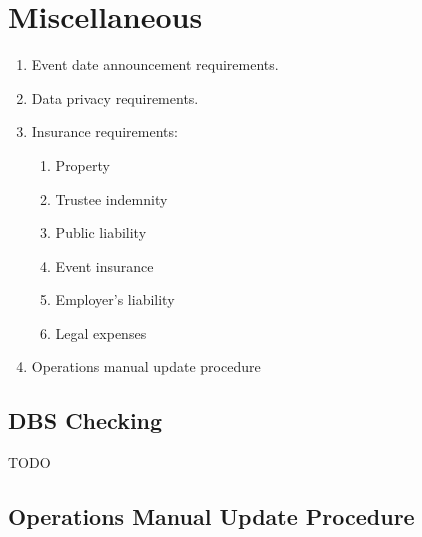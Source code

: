 \chapter{Miscellaneous}
\begin{enumerate}
\item Event date announcement requirements.
\item Data privacy requirements.
\item Insurance requirements:
  \begin{enumerate}
  \item Property
  \item Trustee indemnity
  \item Public liability
  \item Event insurance
  \item Employer's liability
  \item Legal expenses
  \end{enumerate}
\item Operations manual update procedure
\end{enumerate}

\section{DBS Checking}
\label{sec:dbs-checking}

TODO


\section{Operations Manual Update Procedure}
\label{sec:ops-man-update-procedure}

